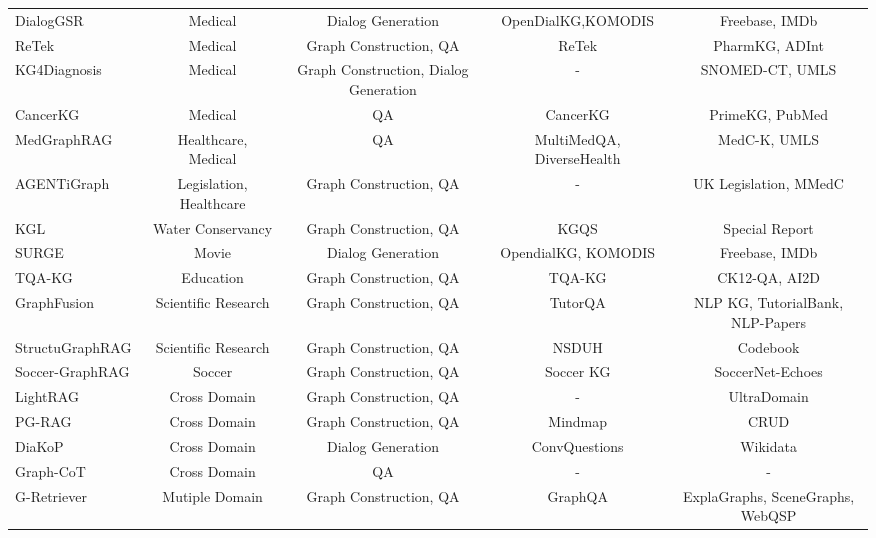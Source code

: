 \documentclass[lettersize,journal]{IEEEtran}
\begin{document}
\begin{table}[t]
{\begin{tabular}{lcccc}
DialogGSR~\cite{park2024generative}&Medical &Dialog Generation &OpenDialKG,KOMODIS &Freebase, IMDb \\
ReTek~\cite{huang2024ritek}&Medical &Graph Construction, QA &ReTek &PharmKG, ADInt \\
KG4Diagnosis~\cite{zuo2024kg4diagnosis}&Medical &Graph Construction, Dialog Generation &- &SNOMED-CT, UMLS\\
CancerKG~\cite{gubanov2024cancerkg}&Medical &QA &CancerKG &PrimeKG, PubMed\\
MedGraphRAG~\cite{wu2024medical}&Healthcare, Medical & QA &MultiMedQA, DiverseHealth &MedC-K, UMLS \\
AGENTiGraph~\cite{zhao2024agentigraph}&Legislation, Healthcare  &Graph Construction, QA &- & UK Legislation, MMedC \\
KGL~\cite{yang2024intelligent}&Water Conservancy &Graph Construction, QA &KGQS &Special Report \\
SURGE~\cite{kang2023knowledge}& Movie &Dialog Generation &OpendialKG, KOMODIS  &Freebase, IMDb \\
TQA-KG~\cite{he2024enhancing}&Education &Graph Construction, QA &TQA-KG &CK12-QA, AI2D \\
GraphFusion~\cite{yang2024graphusion}&Scientific Research &Graph Construction, QA &TutorQA &NLP KG, TutorialBank, NLP-Papers \\
StructuGraphRAG~\cite{zhu2024structugraphrag}&Scientific Research &Graph Construction, QA &NSDUH & Codebook \\
Soccer-GraphRAG~\cite{sepasdar2024soccer}&Soccer &Graph Construction, QA &Soccer KG &SoccerNet-Echoes \\
LightRAG~\cite{guo2024lightrag}&Cross Domain &Graph Construction, QA &- &UltraDomain \\
PG-RAG~\cite{liang2024empowering}&Cross Domain &Graph Construction, QA &Mindmap &CRUD \\
DiaKoP~\cite{lee2024diakop}&Cross Domain &Dialog Generation &ConvQuestions &Wikidata \\
Graph-CoT~\cite{jin2024graph}&Cross Domain &QA &- &-\\
G-Retriever~\cite{he2024g}&Mutiple Domain &Graph Construction, QA &GraphQA &ExplaGraphs, SceneGraphs, WebQSP \\
	\bottomrule
	\end{tabular}
    \vspace{-5mm}
    }
\end{table}
\end{document}
